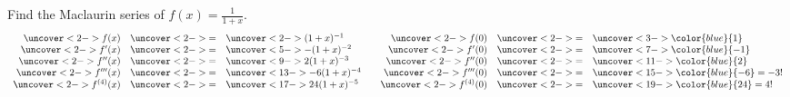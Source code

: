 \begin{frame}
\begin{example} %
Find the Maclaurin series of $f(x) = \frac{1}{1+x}$.
\abovedisplayskip=2pt
\belowdisplayskip=2pt
\[
\begin{array}{rcl@{\qquad}rcl}
\uncover<2->{%
f(x)%
}%
&%
\uncover<2->{%
=%
}%
&%
\uncover<2->{%
(1+x)^{-1}%
}%
&%
\uncover<2->{%
f(0)%
}%
&%
\uncover<2->{%
=%
}%
&%
\uncover<3->{%
\color{blue}{1}%
}\\%

\uncover<2->{%
f'(x)%
}%
&%
\uncover<2->{%
=%
}%
&%
\uncover<5->{%
-(1+x)^{-2}%
}%
&%
\uncover<2->{%
f'(0)%
}%
&%
\uncover<2->{%
=%
}%
&%
\uncover<7->{%
\color{blue}{-1}%
}\\%

\uncover<2->{%
f''(x)%
}%
&%
\uncover<2->{%
=%
}%
&%
\uncover<9->{%
2(1+x)^{-3}%
}%
&%
\uncover<2->{%
f''(0)%
}%
&%
\uncover<2->{%
=%
}%
&%
\uncover<11->{%
\color{blue}{2}%
}\\%

\uncover<2->{%
f'''(x)%
}%
&%
\uncover<2->{%
=%
}%
&%
\uncover<13->{%
-6(1+x)^{-4}%
}%

&%
\uncover<2->{%
f'''(0)%
}%
&%
\uncover<2->{%
=%
}%
&%
\uncover<15->{%
\color{blue}{-6}=-3!%
}%
\\%

\uncover<2->{%
f^{(4)}(x)%
}%
&%
\uncover<2->{%
=%
}%
&%
\uncover<17->{%
24(1+x)^{-5}%
}%

&%
\uncover<2->{%
f^{(4)}(0)%
}%
&%
\uncover<2->{%
=%
}%
&%
\uncover<19->{%
\color{blue}{24}=4!%
}%
\end{array}
\]
%
\end{example}
\end{frame}
